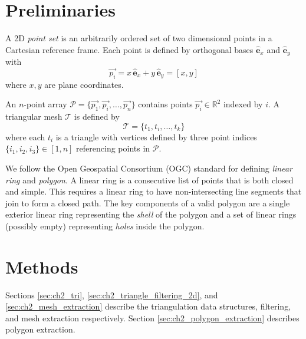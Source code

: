 \section{Preliminaries}\label{sec:ch2_prelim}

A 2D \textit{point set} is an arbitrarily ordered set of two dimensional points in a Cartesian reference frame. Each point is defined by orthogonal bases $\hat{\mathbf{e}}_x$ and $\hat{\mathbf{e}}_y$  with
\begin{equation}
\label{eq:ch2_point}
    \vec{{p}_{i}}=x\,\hat{\mathbf{e}}_x+y\, \hat{\mathbf{e}}_y= [x,y]
\end{equation}
where $x,y$ are plane coordinates.

An $n$-point array $\mathcal{P} = \{ \vec{{p}_{1}}, \vec{{p}_{i}}, \ldots, \vec{{p}_{n}} \}$ contains points $\vec{{p}_{i}} \in \mathbb{R}^2$ indexed by $i$.  A triangular mesh $ \mathcal{T}$ is defined by
\begin{equation}
\label{eq:ch2_tri}
    \mathcal{T} = \{ t_1, t_i, \ldots, t_{k} \}
\end{equation}
where each $t_i$ is a triangle with vertices defined by three point indices $\{i_1, i_2, i_3\} \in \left[1,n\right]$ referencing points in $\mathcal{P}$.

We follow the Open Geospatial Consortium (OGC) standard \cite{herring_opengis_2006-1} for defining \textit{linear ring} and \textit{polygon}. A linear ring is a consecutive list of points that is both closed and simple. This requires a linear ring to have non-intersecting line segments that join to form a closed path. The key components of a valid polygon are a single exterior linear ring representing the \emph{shell} of the polygon and a set of linear rings (possibly empty) representing \emph{holes} inside the polygon. 

\section{Methods}\label{sec:ch2_methods}

Sections \ref{sec:ch2_tri}, \ref{sec:ch2_triangle_filtering_2d}, and \ref{sec:ch2_mesh_extraction} describe the triangulation data structures, filtering, and mesh extraction respectively.  Section \ref{sec:ch2_polygon_extraction} describes polygon extraction. %
